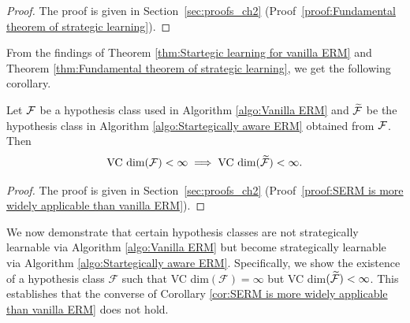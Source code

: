 \begin{proof} The proof is given in Section~\ref{sec:proofs_ch2} (Proof~\ref{proof:Fundamental theorem of strategic learning}).
\end{proof}

From the findings of Theorem \ref{thm:Startegic learning for vanilla ERM} and Theorem \ref{thm:Fundamental theorem of strategic learning}, we get the following corollary.

\begin{cor}\label{cor:SERM is more widely applicable than vanilla ERM}
	Let $\mathcal{F}$ be a hypothesis class used in Algorithm \ref{algo:Vanilla ERM} and $\widetilde{\mathcal{F}}$ be the hypothesis class in Algorithm \ref{algo:Startegically aware ERM} obtained from $\mathcal{F}$. Then
	\[
		\text{VC dim}(\mathcal{F}) < \infty \implies \text{VC dim}(\widetilde{\mathcal{F}}) < \infty.
	\]
\end{cor}

\begin{proof} The proof is given in Section~\ref{sec:proofs_ch2} (Proof~\ref{proof:SERM is more widely applicable than vanilla ERM}).
\end{proof}



We now demonstrate that certain hypothesis classes are not strategically learnable via Algorithm \ref{algo:Vanilla ERM} but become strategically learnable via Algorithm 
\ref{algo:Startegically aware ERM}.  Specifically, we show the existence of a hypothesis class $\mathcal{F}$ such that VC dim$(\mathcal{F}) = \infty$ but VC dim$(\widetilde{\mathcal{F}}) < \infty$. This establishes that the converse of Corollary \ref{cor:SERM is more widely applicable than vanilla ERM} does not hold.

